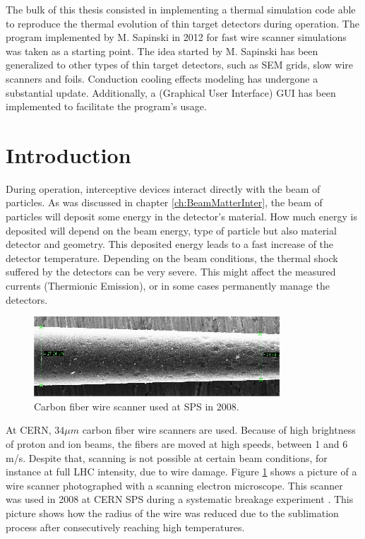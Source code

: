 \pagestyle{fancy}

\graphicspath{ {Figures/Chapter5_ThermalModel/} }

The bulk of this thesis consisted in implementing a thermal simulation code able to reproduce the thermal evolution of thin target detectors during operation.
The program implemented by M. Sapinski in 2012 for fast wire scanner simulations \parencite[][]{ref:Msapinski} was taken as a starting point. The idea started by M. Sapinski has been generalized to other types of thin target detectors, such as SEM grids, slow wire scanners and foils. Conduction cooling effects modeling has undergone a substantial update. Additionally, a (Graphical User Interface) GUI  has been implemented to facilitate the program's usage. 


\section{Introduction}

During operation, interceptive devices interact directly with the beam of particles. As was discussed in chapter \ref{ch:BeamMatterInter}, the beam of particles will deposit some energy in the detector's material. How much energy is deposited will depend on the beam energy, type of particle but also material detector and geometry. This deposited energy leads to a fast increase of the detector temperature. Depending on the beam conditions, the thermal shock suffered by the detectors can be very severe. This might affect the measured currents (Thermionic Emission), or in some cases permanently manage the detectors. 

\begin{figure}[h]
    \centering
    \includegraphics[width=0.60\columnwidth]{WireRadiusDeterioration/WireDamage.png}
    \caption{Carbon fiber wire scanner used at SPS in 2008.}
    \label{fig:WireRadius}
\end{figure}

At CERN, $34 \mu m$ carbon fiber wire scanners are used. Because of high brightness of proton and ion beams, the fibers are moved at high
speeds, between 1 and 6 m/s. Despite that, scanning is not possible at certain beam conditions, for instance at full LHC intensity, due to wire damage. Figure \ref{fig:WireRadius} shows a picture of a wire scanner photographed with a scanning electron microscope. This scanner was used in 2008 at CERN SPS during a systematic breakage experiment \parencite[][]{ref:Msapinski}. This picture shows how the radius of the wire was reduced due to the sublimation process after consecutively reaching high temperatures.

